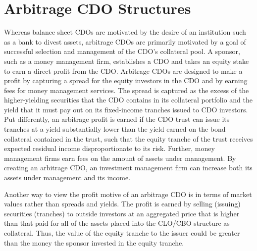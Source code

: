 \documentclass[11pt]{article}
\begin{document}
\section*{Arbitrage CDO Structures}
Whereas balance sheet CDOs are motivated by the desire of an institution such as a bank to divest assets, arbitrage CDOs are primarily motivated by a goal of successful selection and management of the CDO's collateral pool. A sponsor, such as a money management firm, establishes a CDO and takes an equity stake to earn a direct profit from the CDO. Arbitrage CDOs are designed to make a profit by capturing a spread for the equity investors in the CDO and by earning fees for money management services. The spread is captured as the excess of the higher-yielding securities that the CDO contains in its collateral portfolio and the yield that it must pay out on its fixed-income tranches issued to CDO investors. Put differently, an arbitrage profit is earned if the CDO trust can issue its tranches at a yield substantially lower than the yield earned on the bond collateral contained in the trust, such that the equity tranche of the trust receives expected residual income disproportionate to its risk. Further, money management firms earn fees on the amount of assets under management. By creating an arbitrage CDO, an investment management firm can increase both its assets under management and its income.

Another way to view the profit motive of an arbitrage CDO is in terms of market values rather than spreads and yields. The profit is earned by selling (issuing) securities (tranches) to outside investors at an aggregated price that is higher than that paid for all of the assets placed into the CLO/CBO structure as collateral. Thus, the value of the equity tranche to the issuer could be greater than the money the sponsor invested in the equity tranche.
\end{document}
